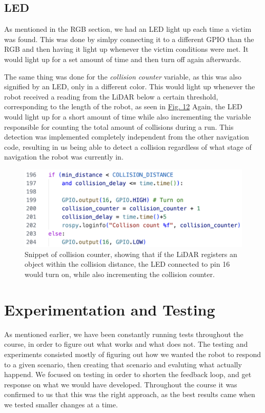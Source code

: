 \documentclass[conference]{IEEEtran}
\begin{document}
\subsection{LED}
As mentioned in the RGB section, we had an LED light up each time a victim was found. This was done by simlpy connecting it to a different GPIO than the RGB and then having it light up whenever the victim conditions were met.
It would light up for a set amount of time and then turn off again afterwards.

The same thing was done for the \textit{collision counter} variable, as this was also signified by an LED, only in a different color.
This would light up whenever the robot received a reading from the LiDAR below a certain threshold, corresponding to the length of the robot, as seen in \href{sec:collision}{Fig. 12}
Again, the LED would light up for a short amount of time while also incrementing the variable responsible for counting the total amount of collisions during a run.
This detection was implemented completely independent from the other navigation code, resulting in us being able to detect a collision regardless of what stage of navigation the robot was currently in.

\begin{figure}[t]
    \centerline{\includegraphics[width=1.0\columnwidth\hspace{0.0cm}]{Pictures/Collision.png}}
    \caption{Snippet of collision counter, showing that if the LiDAR registers an object within the collision distance, 
    the LED connected to pin 16 would turn on, while also incrementing the collision counter.}
    \label{sec:collision}
    \end{figure}

\section{Experimentation and Testing}
As mentioned earlier, we have been constantly running tests throughout the course, in order to figure out what works and what does not.
The testing and experiments consisted mostly of figuring out how we wanted the robot to respond to a given scenario, then creating that scenario and evaluting what actually happend.
We focused on testing in order to shorten the feedback loop, and get response on what we would have developed.
Throughout the course it was confirmed to us that this was the right approach, as the best results came when we tested smaller changes at a time.
\end{document}
